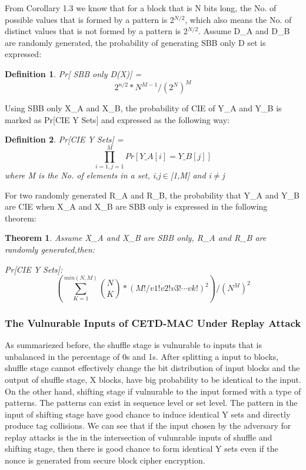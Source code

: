 \documentclass{article}
\newtheorem{theorem}{Theorem}[section]
\newtheorem{defination}{Definition}[section]
\begin{document}
From Corollary 1.3 we know that for a block that is N bits long, the No. of possible values that is formed by a pattern is 2$^{N/2}$, which also means the No. of distinct values that is not formed by a pattern is 2$^{N/2}$. Assume D\_A and D\_B are randomly generated, the probability of generating SBB only D set is expressed:
\begin{defination}
Pr[ SBB only D(X)] =
\begin{equation}
2^{n/2} * N^{M-1} / (2^N)^M
\end{equation}
\end{defination} 

Using SBB only X\_A and X\_B, the probability of CIE of Y\_A and Y\_B is marked as Pr[CIE Y Sets] and expressed as the following way:
\begin{defination}
Pr[CIE Y Sets] = $$\prod_{i=1,j=1}^M Pr[Y\_A[i] = Y\_B[j]]$$ where M is the No. of elements in a set, i,j$\in$[1,M] and i$\neq$j
\end{defination} 

For two randomly generated R\_A and R\_B, the probability that Y\_A and Y\_B are CIE when X\_A and X\_B are SBB only is expressed in the following theorem:
\begin{theorem}
Assume X\_A and X\_B are SBB only, R\_A and R\_B are randomly generated,then:

Pr[CIE Y Sets]:
\begin{displaymath}
(\sum_{K=1}^{min(N,M)} \binom{N}{K} * (M!/v1!v2!v3! \cdots vk!) ^ 2 )/(N^M)^2
\end{displaymath}
\label{set-prob}
\end{theorem}

\subsubsection{The Vulnurable Inputs of CETD-MAC Under Replay Attack}
As summariezed before, the shuffle stage is vulnurable to inputs that is unbalanced in the percentage of 0s and 1s. After splitting a input to blocks, shuffle stage cannot effectively change the bit distribution of input blocks and the output of shuffle stage, X blocks, have big probability to be identical to the input.
On the other hand, shifting stage if vulnurable to the input formed with a type of patterns. The patterns can exist in sequence level or set level. The pattern in the input of shifting stage have good chance to induce identical Y sets and directly produce tag collisions. 
We can see that if the input chosen by the adversary for replay attacks is the in the intersection of vulunrable inputs of shuffle and shifting stage, then there is good chance to form identical Y sets even if the nonce is generated from secure block cipher encryption. 
\end{document}

